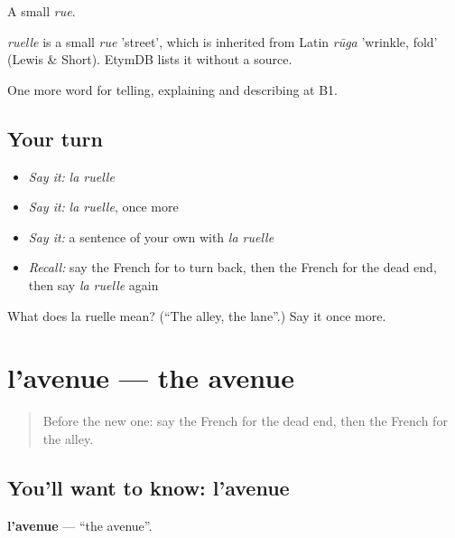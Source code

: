 A small \emph{rue}.

\begin{cousinweb}
\emph{ruelle} is a small \emph{rue} 'street', which is inherited from Latin \emph{rūga} 'wrinkle, fold' (Lewis \& Short). EtymDB lists it without a source.
\end{cousinweb}

\begin{grammarlens}[title={What you've built}]
One more word for telling, explaining and describing at B1.
\end{grammarlens}

\subsection*{Your turn}
\begin{itemize}
\raggedright
  \item \emph{Say it:} \emph{la ruelle}
  \item \emph{Say it:} \emph{la ruelle}, once more
  \item \emph{Say it:} a sentence of your own with \emph{la ruelle}
  \item \emph{Recall:} say the French for to turn back, then the French for the dead end, then say \emph{la ruelle} again
\end{itemize}

\begin{tcolorbox}[breakable,colback=teal!4,colframe=teal!35!black,title={Before you move on}]
What does la ruelle mean? (\textquotedblleft{}The alley, the lane\textquotedblright{}.) Say it once more.
\end{tcolorbox}
\section[l'avenue]{l'avenue — the avenue}

\label{lesson:FR-C437-avenue}



\begin{quote}
Before the new one: say the French for the dead end, then the French for the alley.
\end{quote}

\subsection*{You'll want to know: l'avenue}
\textbf{l'avenue} — \textquotedblleft{}the avenue\textquotedblright{}.

